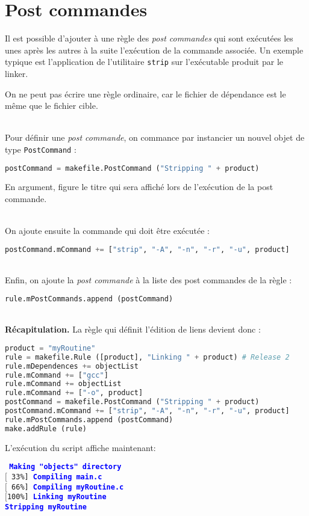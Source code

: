 \documentclass[a4paper,11pt]{extarticle}
\begin{document}
\section{Post commandes}

Il est possible d'ajouter à une règle des \emph{post commandes} qui sont exécutées les unes après les autres à la suite l'exécution de la commande associée. Un exemple typique est l'application de l'utilitaire \texttt{strip} sur l'exécutable produit par le linker.

On ne peut pas écrire une règle ordinaire, car le fichier de dépendance est le même que le fichier cible.

~\\Pour définir une \emph{post commande}, on commance par instancier un nouvel objet de type \texttt{PostCommand} :
\begin{lstlisting}[language=py]
postCommand = makefile.PostCommand ("Stripping " + product)
\end{lstlisting}
En argument, figure le titre qui sera affiché lors de l'exécution de la post commande.

~\\On ajoute ensuite la commande qui doit être exécutée :
\begin{lstlisting}[language=py]
postCommand.mCommand += ["strip", "-A", "-n", "-r", "-u", product]
\end{lstlisting}

~\\Enfin, on ajoute la \emph{post commande} à la liste des post commandes de la règle :
\begin{lstlisting}[language=py]
rule.mPostCommands.append (postCommand)
\end{lstlisting}


~\\{\bf Récapitulation.} La règle qui définit l'édition de liens devient donc :
\begin{lstlisting}[language=py]
product = "myRoutine"
rule = makefile.Rule ([product], "Linking " + product) # Release 2
rule.mDependences += objectList
rule.mCommand += ["gcc"]
rule.mCommand += objectList
rule.mCommand += ["-o", product]
postCommand = makefile.PostCommand ("Stripping " + product)
postCommand.mCommand += ["strip", "-A", "-n", "-r", "-u", product]
rule.mPostCommands.append (postCommand)
make.addRule (rule)
\end{lstlisting}

L'exécution du script affiche maintenant:

\begin{mdframed}[hidealllines=true,backgroundcolor=lightgray!20]
\tt\footnotesize
\textcolor{blue}{\bf Making "objects" directory}\\
$[$~33\%]~\textcolor{blue}{\bf Compiling main.c}\\
$[$~66\%]~\textcolor{blue}{\bf Compiling myRoutine.c}\\
$[$100\%]~\textcolor{blue}{\bf Linking myRoutine}\\
\textcolor{blue}{\bf Stripping myRoutine}
\end{mdframed}
\end{document}
